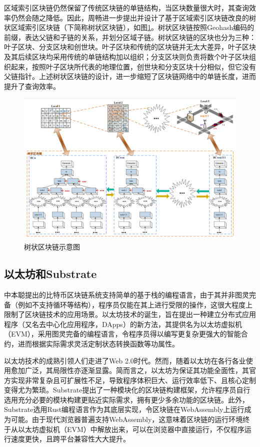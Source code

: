 区域索引区块链仍然保留了传统区块链的单链结构，当区块数量很大时，其查询效率仍然会随之降低。因此，周畅进一步提出并设计了基于区域索引区块链改良的树状区域索引区块链（下简称树状区块链），如图\ref{树状链区块示意图}。树状区块链按照Geohash编码的前缀，表达父链和子链的关系，并划分区域子链。树状区块链的区块也分为三种：叶子区块、分支区块和创世块。叶子区块和传统的区块链并无太大差异，叶子区块及其后续区块均采用传统的单链结构加以组织；分支区块则负责将数个叶子区块组织起来，按照叶子区块所代表的地理位置，创世块和分支区块十分相似，但它没有父链指针。上述树状区块链的设计，进一步缩短了区块链网络中的单链长度，进而提升了查询效率。

\begin{figure}[htbp]
  \centering
  \includegraphics[width=\textwidth]{images/树状链区块示意图.png}
  \caption{树状区块链示意图}\label{树状链区块示意图} %
\end{figure}

\subsection{以太坊和Substrate}

中本聪提出的比特币区块链系统支持简单的基于栈的编程语言，由于其并非图灵完备（例如不支持循环等结构），程序员仅能在其上进行受限的操作，这很大程度上限制了区块链技术的应用场景。以太坊\cite{ethereumWhitePaper}技术的诞生，旨在提出一种建立分布式应用程序（又名去中心化应用程序，DApps）的新方法，其提供名为以太坊虚拟机（EVM），采用图灵完备的编程语言，令程序员得以编写更复杂更强大的智能合约，进而根据实际需求灵活定制状态转换函数等功属性。

以太坊技术的成熟引领人们走进了Web 2.0时代。然而，随着以太坊在各行各业使用愈加广泛，其局限性亦逐渐显露。简而言之，以太坊为保证其功能全面性，其官方实现非常复杂且可扩展性不足，导致程序体积巨大、运行效率低下、且核心定制变得尤为繁琐。Substrate提出了一种模块化的区块链构建框架，允许程序员自行选用充分必要的模块构建更贴近实际需求，拥有更少多余功能的区块链。此外，Substrate选用Rust编程语言作为其底层实现，令区块链在WebAssembly上运行成为可能。由于现代浏览器普遍支持WebAssembly，这意味着区块链的运行环境终于从以太坊虚拟机（EVM）中解放出来，可以在浏览器中直接运行，不仅程序运行速度更快，且跨平台兼容性大大提升。


